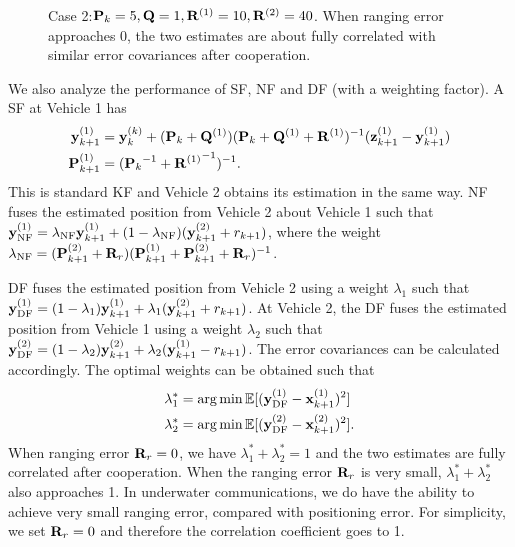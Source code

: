 \begin{figure}[htbp]
\centering
{}
\caption{Case 2:${\bf P}_k=5,{\bf Q}=1,{\bf R}^{(1)}=10,{\bf R}^{(2)}=40$. When ranging error approaches 0, the two estimates are about fully correlated with similar error covariances after cooperation.}
\label{fig:CKFeg2}
\end{figure}

We also analyze the performance of SF, NF and DF (with a weighting factor). A SF at Vehicle 1 has
\begin{equation}
\begin{split}
    {\bf y}^{(1)}_{k+1}&={\bf y}_k^{(k)}+({\bf P}_k+{\bf Q}^{(1)})({\bf P}_k+{\bf Q}^{(1)}+{\bf R}^{(1)})^{-1}({\bf z}^{(1)}_{k+1}-{\bf y}^{(1)}_{k+1}) \\
    {\bf P}^{(1)}_{k+1}&=({{\bf P}_k}^{-1}+{{\bf R}^{(1)}}^{-1})^{-1}. \\
\end{split}
\end{equation}
This is standard KF and Vehicle 2 obtains its estimation in the same way. NF fuses the estimated position from Vehicle 2 about Vehicle 1 such that ${\bf y}^{(1)}_{\text{NF}}=\lambda_\text{NF}{\bf y}^{(1)}_{k+1}+(1-\lambda_\text{NF})({\bf y}^{(2)}_{k+1}+{r}_{k+1})$, where the weight $\lambda_\text{NF}=({\bf P}^{(2)}_{k+1}+{\bf R}_r)({\bf P}^{(1)}_{k+1}+{\bf P}^{(2)}_{k+1}+{\bf R}_r)^{-1}$.

DF fuses the estimated position from Vehicle 2 using a weight $\lambda_1$ such that ${\bf y}^{(1)}_{\text{DF}}=(1-\lambda_1){\bf y}^{(1)}_{k+1}+\lambda_1({\bf y}^{(2)}_{k+1}+r_{k+1})$. At Vehicle 2, the DF fuses the estimated position from Vehicle 1 using a weight $\lambda_2$ such that ${\bf y}^{(2)}_{\text{DF}}=(1-\lambda_2){\bf y}^{(2)}_{k+1}+\lambda_2({\bf y}^{(1)}_{k+1}-{r}_{k+1})$. The error covariances can be calculated accordingly. The optimal weights can be obtained such that
\begin{equation}
\begin{split}
    \lambda_1^*&=\arg\min\mathbb{E}[({\bf y}^{(1)}_{\text{DF}}-{\bf x}^{(1)}_{k+1})^2]\\
    \lambda_2^*&=\arg\min\mathbb{E}[({\bf y}^{(2)}_{\text{DF}}-{\bf x}^{(2)}_{k+1})^2].\\
\end{split}
\label{eq:mvlDF}
\end{equation}
When ranging error ${\bf R}_r=0$, we have $\lambda_1^*+\lambda_2^*=1$ and the two estimates are fully correlated after cooperation. When the ranging error ${\bf R}_r$ is very small, $\lambda_1^*+\lambda_2^*$ also approaches 1. In underwater communications, we do have the ability to achieve very small ranging error, compared with positioning error. For simplicity, we set ${\bf R}_r=0$ and therefore the correlation coefficient goes to 1.

